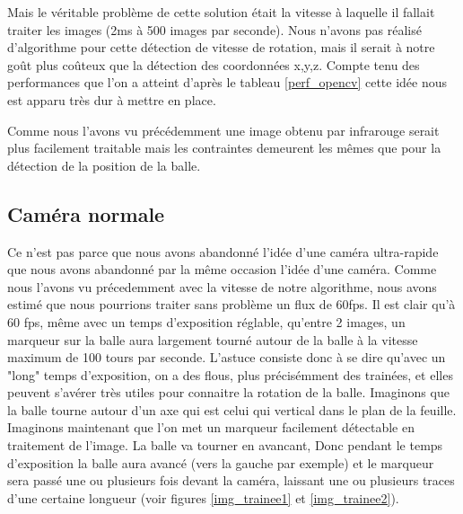 Mais le véritable problème de cette solution était la vitesse à laquelle il fallait traiter les images (2ms à 500 images par seconde). Nous n'avons pas réalisé d'algorithme pour cette détection de vitesse de rotation, mais il serait à notre goût plus coûteux que la détection des coordonnées x,y,z. Compte tenu des performances que l'on a atteint d'après le tableau \ref{perf_opencv} cette idée nous est apparu très dur à mettre en place.




Comme nous l'avons vu précédemment une image obtenu par infrarouge serait plus facilement traitable mais les contraintes demeurent les mêmes que pour la détection de la position de la balle.





\subsection{Caméra normale}

Ce n'est pas parce que nous avons abandonné l'idée d'une caméra ultra-rapide que nous avons abandonné par la même occasion l'idée d'une caméra. Comme nous l'avons vu précedemment avec la vitesse de notre algorithme, nous avons estimé que nous pourrions traiter sans problème un flux de 60fps. Il est clair qu'à 60 fps, même avec un temps d'exposition réglable, qu'entre 2 images, un marqueur sur la balle aura largement tourné autour de la balle à la vitesse maximum de 100 tours par seconde. L'astuce consiste donc à se dire qu'avec un "long" temps d'exposition, on a des flous, plus précisémment des trainées, et elles peuvent s'avérer très utiles pour connaitre la rotation de la balle. Imaginons que la balle tourne autour d'un axe qui est celui qui vertical dans le plan de la feuille. Imaginons maintenant que l'on met un marqueur facilement détectable en traitement de l'image. La balle va tourner en avancant, Donc pendant le temps d'exposition la balle aura avancé (vers la gauche par exemple) et le marqueur sera passé une ou plusieurs fois devant la caméra, laissant une ou plusieurs traces d'une certaine longueur (voir figures \ref{img_trainee1} et \ref{img_trainee2}).



